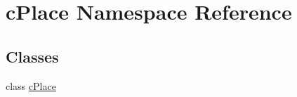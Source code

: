 \hypertarget{namespacecPlace}{\section{c\-Place \-Namespace \-Reference}
\label{namespacecPlace}
}
\subsection*{\-Classes}
\begin{DoxyCompactItemize}
\item 
class \hyperlink{classcPlace_1_1cPlace}{c\-Place}
\end{DoxyCompactItemize}
